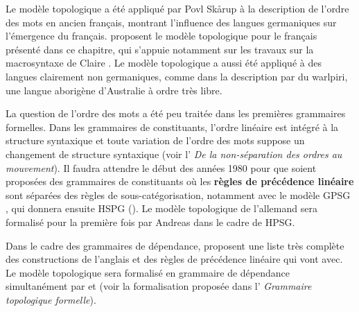 {    Le modèle topologique a été appliqué par Povl Skårup  à la description de l’ordre des mots en ancien français, montrant l’influence des langues germaniques sur l’émergence du français. \citet{gerdes2006amas} proposent le modèle topologique pour le français présenté dans ce chapitre, qui s’appuie notamment sur les travaux sur la macrosyntaxe de Claire \citet{blanche-benveniste1990francais}. Le modèle topologique a aussi été appliqué à des langues clairement non germaniques, comme dans la description par \citet{DonohueSag1999} du warlpiri, une langue aborigène d’Australie à ordre très libre.

    La question de l’ordre des mots a été peu traitée dans les premières grammaires formelles. Dans les grammaires de constituants, l’ordre linéaire est intégré à la structure syntaxique et toute variation de l’ordre des mots suppose un changement de structure syntaxique (voir l’ \textit{De la non-séparation des ordres au mouvement}). Il faudra attendre le début des années 1980 pour que soient proposées des grammaires de constituants où les \textbf{règles de précédence linéaire} sont séparées des règles de sous-catégorisation, notamment avec le modèle GPSG \citep{gazdar1985generalized}, qui donnera ensuite HSPG (\citealt{PollardSag1987}). Le modèle topologique de l’allemand sera formalisé pour la première fois par Andreas \citet{kathol1995linearization-based} dans le cadre de HPSG.

    Dans le cadre des grammaires de dépendance, \citet{melcuk1987surface} proposent une liste très complète des constructions de l’anglais et des règles de précédence linéaire qui vont avec. Le modèle topologique sera formalisé en grammaire de dépendance simultanément par \citet{duchier2001topological} et \citet{gerdes2001word} (voir la formalisation proposée dans l’ \textit{Grammaire topologique formelle}).
}
